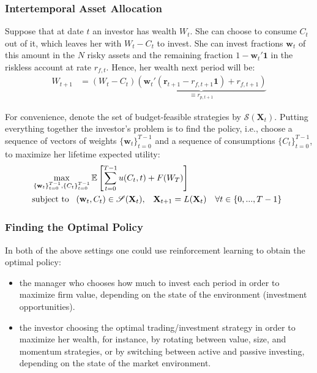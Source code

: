 \documentclass[xcolor=dvipsnames, english, 8pt]{beamer}
\begin{document}
\begin{frame}
    \frametitle{Intertemporal Asset Allocation}

  	Suppose that at date $t$ an investor has wealth $W_t$. She can choose to consume $C_t$ out of it, which leaves her with $W_t-C_t$ to invest. She can invest fractions $\mathbf{w}_t$ of this amount in the $N$ risky assets and the remaining fraction $1-\mathbf{w}_t'\mathbf{1}$ in the riskless account at rate $r_{f,t}$. Hence, her wealth next period will be:
    \begin{align}
  	W_{t+1}&=(W_t-C_t)\underbrace{(\mathbf{w}_t'(\mathbf{r}_{t+1}-r_{f,t+1}\mathbf{1})+r_{f,t+1})}_{\equiv r_{p,t+1}}
\end{align}

For convenience, denote the set of budget-feasible strategies by $\mathscr{S}(\mathbf{X}_t)$. Putting everything together the investor's problem is to {\color{ubRed} find the policy, i.e., choose a sequence of vectors of weights} $\{\mathbf{w}_t\}_{t=0}^{T-1}$ and a {\color{ubRed}sequence of consumptions} $\{C_t\}_{t=0}^{T-1}$, to maximize her lifetime expected utility:\begin{align}
  	&\max_{\{\mathbf{w}_t\}_{t=0}^{T-1},\{C_t\}_{t=0}^{T-1}}\mathbb{E}\left[\sum_{t=0}^{T-1}u(C_t,t)+F(W_T)\right]\\
  	&\text{subject to }\begin{array}{c c c}(\mathbf{w}_t,C_t)\in\mathscr{S}(\mathbf{X}_t), & \mathbf{X}_{t+1}=L(\mathbf{X}_{t}) & \forall t\in\{0,...,T-1\}\notag\end{array}
\end{align}
\end{frame}

\begin{frame}
    \frametitle{Finding the Optimal Policy}
    In both of the above settings one could use reinforcement learning to obtain the {\color{ubRed}optimal policy}:\vspace{0.25cm}\\
    \begin{itemize}
        \item the manager who chooses how much to invest each period in order to maximize firm value, depending on the state of the environment (investment opportunities).
        \item the investor choosing the optimal trading/investment strategy in order to maximize her wealth, for instance, by rotating between value, size, and momentum strategies, or by switching between active and passive investing, depending on the state of the market environment.
    \end{itemize}
\end{frame}
\end{document}
